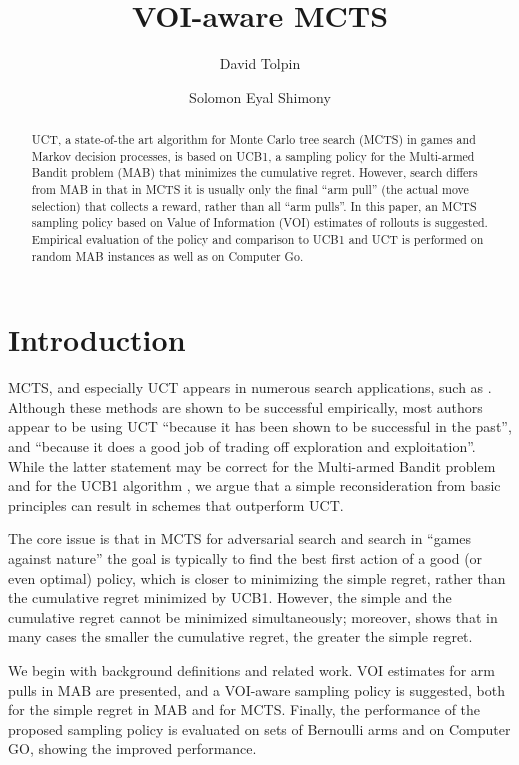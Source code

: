 \documentclass{ecai2012}
\title{VOI-aware MCTS}
\author {David Tolpin \and Solomon Eyal Shimony \institute{Ben-Gurion
    University of the Negev, Israel, 
email: \{tolpin,shimony\}@cs.bgu.ac.il} }
\begin{document}
\maketitle

\begin{abstract}
UCT, a state-of-the art algorithm for Monte Carlo tree search (MCTS)
in games and Markov decision processes, is based on UCB1, a sampling
policy for the Multi-armed Bandit problem (MAB) that 
minimizes the cumulative regret.  However, search differs from MAB in
that in MCTS it is usually only the final ``arm pull'' (the actual
move selection) that collects a reward, rather than all ``arm pulls''.
In this paper, an MCTS sampling policy based on Value of Information
(VOI) estimates of rollouts is suggested. Empirical evaluation of the
policy and comparison to UCB1 and UCT is performed on random MAB instances
as well as on Computer Go.
\end{abstract}

\section{Introduction}

MCTS, and especially UCT \cite{Kocsis.uct} appears in numerous search
applications, such as \cite{Eyerich.ctp}. Although these methods are
shown to be successful empirically, most authors appear to be using
UCT ``because it has been shown to be successful in the past'', and
``because it does a good job of trading off exploration and
exploitation''. While the latter statement may be correct for the
Multi-armed Bandit problem and for the UCB1 algorithm \cite{Auer.ucb},
we argue that a simple reconsideration from basic principles can
result in schemes that outperform UCT.

The core issue is that in MCTS for adversarial search and search in
``games against nature'' the goal is typically to find the best
first action of a good (or even optimal) policy, which is closer to
minimizing the simple regret, rather than the cumulative regret
minimized by UCB1.  However, the simple and the cumulative regret
cannot be minimized simultaneously; moreover, \cite{Bubeck.pure} shows
that in many cases the smaller the cumulative regret, the greater the
simple regret.

We begin with background definitions and related work.  VOI estimates
for arm pulls in MAB are presented, and a VOI-aware sampling policy is
suggested, both for the simple regret in MAB and for MCTS.  Finally,
the performance of the proposed sampling policy is evaluated on sets
of Bernoulli arms and on Computer GO, showing the improved
performance.
\end{document}
